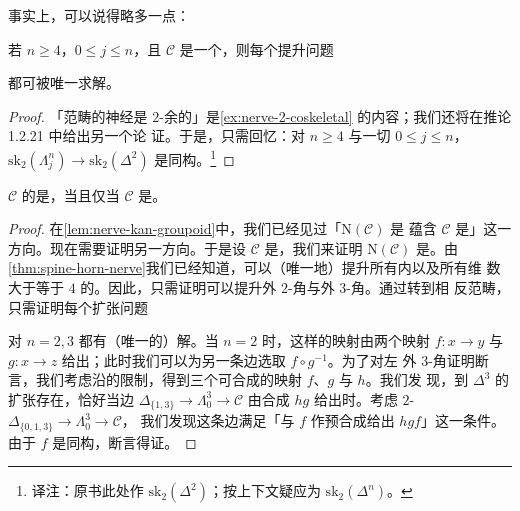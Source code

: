 事实上，可以说得略多一点：

\begin{lemma}\label{lem:lifting-nerves}
若 $n \ge 4$，$0 \le j \le n$，且 $\mathcal{C}$ 是一个\trCategory{}，则每个提升问题
\begin{center}
\end{center}
都可被唯一求解。
\end{lemma}

\begin{proof}
「范畴的神经是 $2$-余\trSkeleton{}的」是\cref{ex:nerve-2-coskeletal} 的内容；我们还将在推论 1.2.21 中给出另一个论
证。于是，只需回忆：对 $n \ge 4$ 与一切 $0 \le j \le n$，
$\mathrm{sk}_2(\Lambda^n_j) \to \mathrm{sk}_2(\Delta^2)$
是同构。\footnote{译注：原书此处作 $\mathrm{sk}_2(\Delta^2)$；按上下文疑应为
$\mathrm{sk}_2(\Delta^n)$。}
\end{proof}

\begin{lemma}\label{lem:nerve-kan-iff-groupoid}
\trCategory{} $\mathcal{C}$ 的\trNerve{}是\trKanComplex{}，当且仅当 $\mathcal{C}$ 是\trGroupoid{}。
\end{lemma}

\begin{proof}
在\cref{lem:nerve-kan-groupoid}中，我们已经见过「$\mathrm{N}(\mathcal{C})$ 是%
\trKanComplex{}蕴含 $\mathcal{C}$ 是\trGroupoid{}」这一方向。现在需要证明另一方向。于是设
$\mathcal{C}$ 是\trGroupoid{}，我们来证明 $\mathrm{N}(\mathcal{C})$ 是\trKanComplex{}。由
\cref{thm:spine-horn-nerve}我们已经知道，可以（唯一地）提升所有内\trHorn{}以及所有维
数大于等于 $4$ 的\trHorn{}。因此，只需证明可以提升外 $2$-角与外 $3$-角。通过转到相
反范畴，只需证明每个扩张问题
\begin{center}
\end{center}
对 $n = 2, 3$ 都有（唯一的）解。当 $n = 2$ 时，这样的映射由两个映射 $f\colon x \to y$
与 $g\colon x \to z$ 给出；此时我们可以为另一条边选取 $f \circ g^{-1}$。为了对左
外 $3$-角证明断言，我们考虑沿\trSpine{}的限制，得到三个可合成的映射 $f$、$g$ 与 $h$。我们发
现，到 $\Delta^3$ 的扩张存在，恰好当边 $\Delta_{\{1,3\}} \to \Lambda^3_0 \to \mathcal{C}$
由合成 $hg$ 给出时。考虑 $2$-\trSimplex{} $\Delta_{\{0,1,3\}} \to \Lambda^3_0 \to \mathcal{C}$，
我们发现这条边满足「与 $f$ 作预合成给出 $hgf$」这一条件。由于 $f$
是同构，断言得证。
\end{proof}
